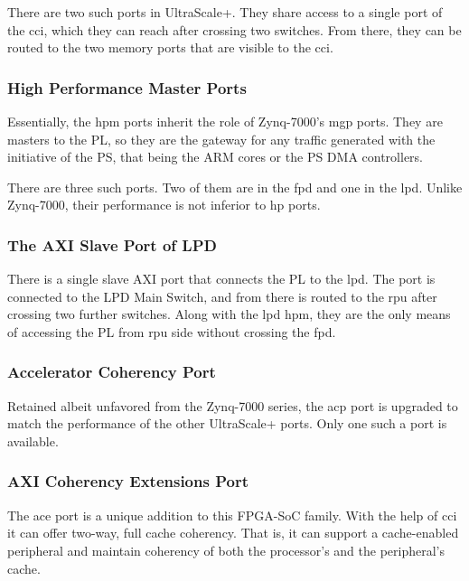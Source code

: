 There are two such ports in UltraScale+. They share access to a single
port of the \gls{cci}, which they can reach after crossing two switches.
From there, they can be routed to the two memory ports that are visible
to the \gls{cci}.

\subsubsection{High Performance Master Ports}

Essentially, the \gls{hpm} ports inherit the role of Zynq-7000's \gls{mgp} ports.
They are masters to the PL, so they are the gateway for any traffic generated with
the initiative of the PS, that being the ARM cores or the PS DMA controllers.

There are three such ports. Two of them are in the \gls{fpd} and one in the \gls{lpd}.
Unlike Zynq-7000, their performance is not inferior to \gls{hp} ports.

\subsubsection{The AXI Slave Port of LPD}

There is a single slave AXI port that connects the PL to the \acrlong{lpd}.
The port is connected to the LPD Main Switch, and from there is routed to the \gls{rpu}
after crossing two further switches. 
Along with the \gls{lpd} \gls{hpm}, 
they are the only means of accessing the PL from
\gls{rpu} side without crossing the \acrlong{fpd}.


\subsubsection{Accelerator Coherency Port}

Retained albeit unfavored from the Zynq-7000 series, the \gls{acp} port
is upgraded to match the performance of the other UltraScale+ ports.
Only one such a port is available.

\subsubsection{AXI Coherency Extensions Port}

The \gls{ace} port is a unique addition to this FPGA-SoC family. 
With the help of \gls{cci} it can offer two-way, full cache coherency.
That is, it can support a cache-enabled peripheral and maintain coherency of both
the processor's and the peripheral's cache.

